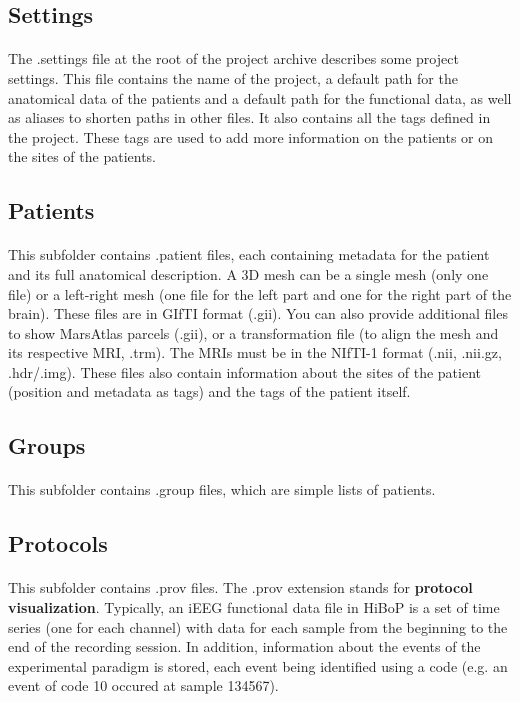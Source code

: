 \documentclass[a4paper]{article}
\begin{document}
\subsection{Settings}
\paragraph{} The .settings file at the root of the project archive describes some project settings. This file contains the name of the project, a default path for the anatomical data of the patients and a default path for the functional data, as well as aliases to shorten paths in other files. It also contains all the tags defined in the project. These tags are used to add more information on the patients or on the sites of the patients.
\subsection{Patients}
\paragraph{} This subfolder contains .patient files, each containing metadata for the patient and its full anatomical description. A 3D mesh can be a single mesh (only one file) or a left-right mesh (one file for the left part and one for the right part of the brain). These files are in GIfTI format (.gii). You can also provide additional files to show MarsAtlas parcels (.gii), or a transformation file (to align the mesh and its respective MRI, .trm). The MRIs must be in the NIfTI-1 format (.nii, .nii.gz, .hdr/.img). These files also contain information about the sites of the patient (position and metadata as tags) and the tags of the patient itself.
\subsection{Groups}
\paragraph{} This subfolder contains .group files, which are simple lists of patients.
\subsection{Protocols}
\paragraph{} This subfolder contains .prov files. The .prov extension stands for \textbf{protocol visualization}. Typically, an iEEG functional data file in HiBoP is a set of time series (one for each channel) with data for each sample from the beginning to the end of the recording session. In addition, information about the events of the experimental paradigm is stored, each event being identified using a code (e.g. an event of code 10 occured at sample 134567).
\end{document}
